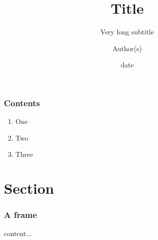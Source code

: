 \documentclass{beamer}
\title{Title}
\subtitle{Very long subtitle}
\author{Author(s)}
\institute{Institute}
\date{date}
\begin{document}
	\setcounter{showProgressBar}{0}
	\setcounter{showSlideNumbers}{0}

	\frame{\titlepage}

	\begin{frame}
		\frametitle{Contents}
		\begin{enumerate}
			\item One
			\item Two
			\item Three
		\end{enumerate}
	\end{frame}

	\setcounter{framenumber}{0}
	\setcounter{showProgressBar}{1}
	\setcounter{showSlideNumbers}{1}
	\section{Section}
	\begin{frame}
		\frametitle{A frame}
		content...
	\end{frame}
\end{document}

